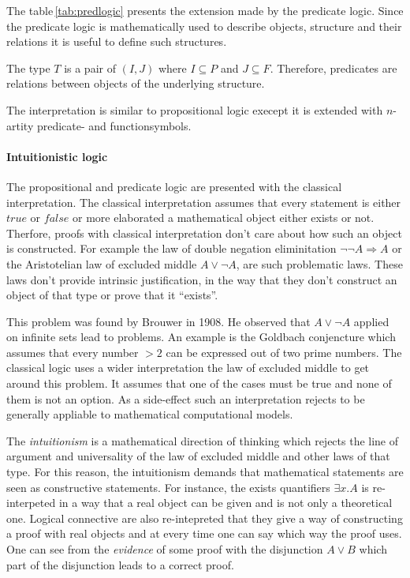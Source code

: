 The table\,\ref{tab:predlogic} presents the extension made by the predicate logic.
Since the predicate logic is mathematically used to describe objects,
structure and their relations it is useful to define such structures.~\cite{heinemann2013logik}

\begin{defi}
  The type $T$ is a pair of $(I,J)$ where $I\subseteq P$ and $J\subseteq F$.
  Therefore, predicates are relations between objects of the underlying
  structure.
\end{defi}

The interpretation is similar to propositional logic execept it is
extended with $n$-artity predicate- and functionsymbols.~\cite{heinemann2013logik}

\paragraph{Intuitionistic logic}
The propositional and predicate logic are presented with the classical
interpretation. The classical interpretation assumes that every statement
is either $true$ or $false$ or more elaborated a mathematical object either
exists or not. Therfore, proofs with classical interpretation don't care
about how such an object is constructed. For example the law of double
negation eliminitation  $\neg\neg A\Rightarrow A$ or the Aristotelian law of excluded
middle $A \vee \neg A$, are such problematic laws. These laws don't provide
intrinsic justification, in the way that they don't construct an object
of that type or prove that it ``exists''.~\cite{sep-logic-intuitionistic, kreitz1994automatisierte}

This problem was found by Brouwer in 1908. He observed that $A \vee \neg A$
applied on infinite sets lead to problems. An example is the Goldbach
conjencture which assumes that every number $> 2$ can be expressed out of
two prime numbers. The classical logic uses a wider interpretation
the law of excluded middle to get around this problem. It assumes
that one of the cases must be true and none of them is not an option.
As a side-effect such an interpretation rejects to be generally
appliable to mathematical computational models.~\cite{sep-logic-intuitionistic, sep-mathematics-constructive} 

The \textit{intuitionism} is a mathematical direction of thinking which
rejects the line of argument and universality of the law of excluded middle
and other laws of that type. For this reason, the intuitionism demands
that mathematical statements are seen as constructive statements.
For instance, the exists quantifiers $\exists x.A$ is re-interpeted in a way
that a real object can be given and is not only a theoretical one.
Logical connective are also re-intepreted that they give a way
of constructing a proof with real objects and at every time one can
say which way the proof uses. One can see from the \textit{evidence}
of some proof with the disjunction $A\vee B$ which part of the disjunction
leads to a correct proof.~\cite{kreitz1994automatisierte}

